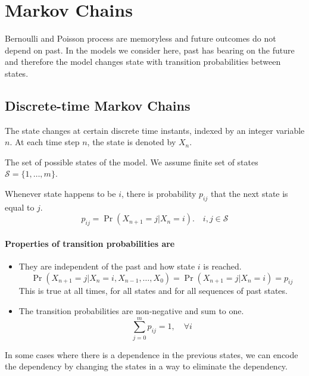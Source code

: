 \chapter{Markov Chains}
\newcommand*{\MC}{Markov Chains}
Bernoulli and Poisson process are memoryless and future outcomes do not depend on past. In the models we consider here, past has bearing on the future and therefore the model changes state with transition probabilities between states.

\section{Discrete-time Markov Chains}
The state changes at certain discrete time instants, indexed by an integer variable $n$. At each time step $n$, the state is denoted by $X_n$.

\begin{definition}
    The set of possible states of the model. We assume finite set of states $\mathcal S =\{1,\dots,m\}$.
\end{definition}
\begin{definition}
    Whenever state happens to be $i$, there is probability $p_{ij}$ that the next state is equal to $j$.
    \[p_{ij}=\Pr(X_{n+1}=j|X_n=i). \quad i,j \in \mathcal{S}\]
\end{definition}

\subsubsection{Properties of transition probabilities are}
\begin{itemize}
    \item They are independent of the past and how state $i$ is reached.
    \[\Pr(X_{n+1}=j|X_n=i, X_{n-1}, \ldots, X_{0})=\Pr(X_{n+1}=j|X_n=i)=p_{ij}\]
    This is true at all times, for all states and for all sequences of past states.
    \item The transition probabilities are non-negative and sum to one.
    \[\sum_{j=0}^m p_{ij}=1, \quad \forall i\]
\end{itemize}

\begin{remark}
    In some cases where there is a dependence in the previous states, we can encode the dependency by changing the states in a way to eliminate the dependency.
\end{remark}
